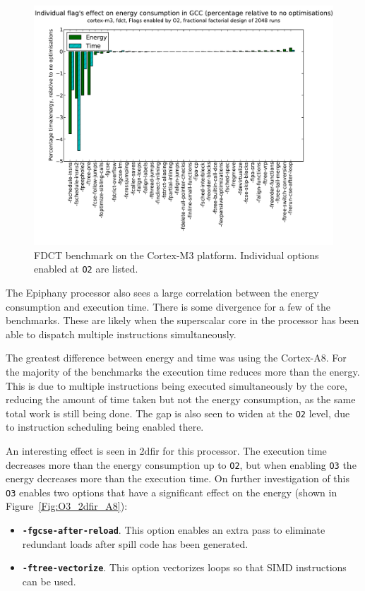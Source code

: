 \documentclass[twocolumn]{article}
\let\oldcaption\caption
\renewcommand{\caption}[1]{\oldcaption{\textup{#1}}}
\begin{document}
\begin{figure}[bt!]
	\includegraphics[width=\linewidth,clip,trim=0.5cm 0 2cm 1.8cm]{cortex-m3/O2_main_effects_fdct.pdf}
	\caption{FDCT benchmark on the Cortex-M3 platform. Individual options enabled at \texttt{O2} are listed.}
	\label{Fig:FdctO2MainEffects}
\end{figure}

The Epiphany processor also sees a large correlation between the energy consumption and execution time. There is some divergence for a few of the benchmarks. These are likely when the superscalar core in the processor has been able to dispatch multiple instructions simultaneously.

The greatest difference between energy and time was using the Cortex-A8. For the majority of the benchmarks the execution time reduces more than the energy. This is due to multiple instructions being executed simultaneously by the core, reducing the amount of time taken but not the energy consumption, as the same total work is still being done. The gap is also seen to widen at the \texttt{O2} level, due to instruction scheduling being enabled there.

An interesting effect is seen in 2dfir for this processor. The execution time decreases more than the energy consumption up to \texttt{O2}, but when enabling \texttt{O3} the energy decreases more than the execution time. On further investigation of this \texttt{O3} enables two options that have a significant effect on the energy (shown in Figure~\ref{Fig:O3_2dfir_A8}):
\begin{itemize}
	\item \texttt{\bfseries -fgcse-after-reload}. This option enables an extra pass to eliminate redundant loads after spill code has been generated.
	\item \texttt{\bfseries -ftree-vectorize}. This option vectorizes loops so that SIMD instructions can be used.
\end{itemize}
\end{document}
